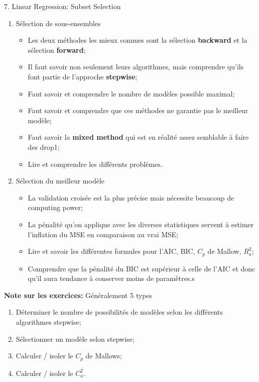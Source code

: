 \documentclass[12pt, titlepage, french]{report}
\begin{document}
\begin{CHPT_SUMM}{7. Linear Regression:  Subset Selection}
\begin{enumerate}
	\item	Sélection de sous-ensembles
	\begin{itemize}
		\item	Les deux méthodes les mieux connues sont la sélection \textbf{backward} et la sélection \textbf{forward};
		\item	Il faut savoir non seulement leurs algorithmes, mais comprendre qu'ils font partie de l'approche \textbf{stepwise};
		\item	Faut savoir et comprendre le nombre de modèles possible maximal;
		\item	Faut savoir et comprendre que ces méthodes ne garantie pas le meilleur modèle;
		\item	Faut savoir la \textbf{mixed method} qui est en réalité assez semblable à faire des drop1;
		\item	Lire et comprendre les différents problèmes.
	\end{itemize}
	\item	Sélection du meilleur modèle
	\begin{itemize}
		\item	La validation croisée est la plus précise mais nécessite beaucoup de computing power;
		\item	La pénalité qu'on applique avec les diverses statistiques servent à estimer l'inflation du MSE en comparaison au vrai MSE;
		\item	Lire et savoir les différentes formules pour l'AIC, BIC, $C_{p}$ de Mallow, $R^{2}_{a}$;
		\item	Comprendre que la pénalité du BIC est supérieur à celle de l'AIC et donc qu'il aura tendance à conserver moins de paramètres.s
	\end{itemize}
\end{enumerate}
\textbf{Note sur les exercices:} Généralement 5 types
\begin{enumerate}
	\item	Déterminer le nombre de possibilités de modèles selon les différents algorithmes stepwise;
	\item	Sélectionner un modèle selon stepwise;
	\item	Calculer / isoler le $C_{p}$ de Mallows;
	\item	Calculer / isoler le $C_{a}^{2}$.
\end{enumerate}
\end{CHPT_SUMM}
\end{document}
